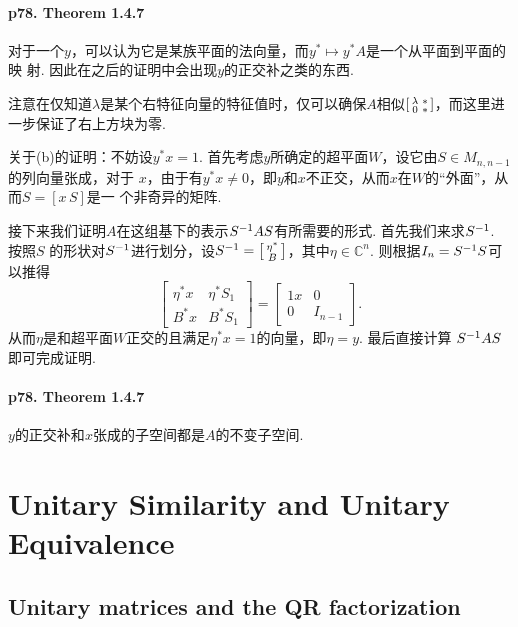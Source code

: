   \paragraph{p78. Theorem 1.4.7}
    对于一个$y$，可以认为它是某族平面的法向量，而$y^*\mapsto y^*A$是一个从平面到平面的映
    射. 因此在之后的证明中会出现$y$的正交补之类的东西. \par
    注意在仅知道$\lambda$是某个右特征向量的特征值时，仅可以确保$A$相似$\begin{bsmallmatrix}
    \lambda & * \\ 0 & *  \end{bsmallmatrix}$，而这里进一步保证了右上方块为零. \par
    关于(b)的证明：不妨设$y^*x = 1$.
    首先考虑$y$所确定的超平面$W$，设它由$S\in M_{n,n-1}$的列向量张成，对于
    $x$，由于有$y^*x\ne 0$，即$y$和$x$不正交，从而$x$在$W$的“外面”，从而$S=[x\, S]$是一
    个非奇异的矩阵. \par
    接下来我们证明$A$在这组基下的表示$S^{-1} AS$有所需要的形式. 首先我们来求$S^{-1}$. 按照$S$
    的形状对$S^{-1}$进行划分，设$S^{-1} = \begin{bsmallmatrix} \eta^* \\ B
    \end{bsmallmatrix}$，其中$\eta\in\mathbb{C}^n$. 则根据$I_n=S^{-1} S$可以推得
    \[
      \begin{bmatrix}
        \eta^* x & \eta^*S_1 \\ B^* x & B^* S_1
      \end{bmatrix}
      =
      \begin{bmatrix}
        1 x & 0 \\ 0 & I_{n-1}
      \end{bmatrix}.
    \]
    从而$\eta$是和超平面$W$正交的且满足$\eta^* x =1$的向量，即$\eta=y$. 最后直接计算
    $S^{-1} AS$即可完成证明. 
  \paragraph{p78. Theorem 1.4.7}
    $y$的正交补和$x$张成的子空间都是$A$的不变子空间. 




\newpage
\section{Unitary Similarity and Unitary Equivalence}
\subsection{Unitary matrices and the QR factorization}
